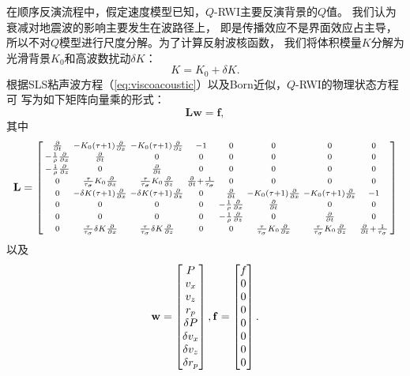 在顺序反演流程中，假定速度模型已知，$Q$-RWI主要反演背景的$Q$值。
我们认为衰减对地震波的影响主要发生在波路径上，
即是传播效应不是界面效应占主导，所以不对$Q$模型进行尺度分解。为了计算反射波核函数，
我们将体积模量$K$分解为光滑背景$K_0$和高波数扰动$\delta K$：
\begin{equation}
	K = K_0 + \delta K.
\end{equation}
根据SLS粘声波方程（\ref{eq:viscoacoustic}）以及Born近似，$Q$-RWI的物理状态方程可
写为如下矩阵向量乘的形式：
\begin{equation}
    \mathbf{L}\mathbf{w} = \mathbf{f},
    \label{eq:state}
\end{equation}
其中
    \begin{eqnarray*}
        \mathbf{L}= 
        \begin{bmatrix}
            \begin{smallmatrix}
            \frac{\partial}{\partial t} &-K_0(\tau +1)\frac{\partial}{\partial x}
            &-K_0(\tau +1)\frac{\partial}{\partial z} &-1 &0 &0 &0 &0\cr
            -\frac{1}{\rho}\frac{\partial}{\partial x} &\frac{\partial}{\partial t} &0
            &0 &0 &0 &0 &0\cr
            -\frac{1}{\rho}\frac{\partial}{\partial z} &0 &\frac{\partial}{\partial t}
            &0 &0 &0 &0 &0\cr
            0 & \frac{\tau}{\tau_\sigma}K_0\frac{\partial}{\partial x}
            &\frac{\tau}{\tau_\sigma}K_0\frac{\partial}{\partial z}
            &\frac{\partial}{\partial t}+\frac{1}{\tau_\sigma} &0 &0 &0 &0 \cr
            0 &-\delta K(\tau+1)\frac{\partial}{\partial x} &-\delta
            K(\tau+1)\frac{\partial}{\partial z} &0 &\frac{\partial}{\partial t}
            &-K_0(\tau +1)\frac{\partial}{\partial x} &-K_0(\tau
            +1)\frac{\partial}{\partial z} &-1 \cr
            0 &0 &0 &0 &-\frac{1}{\rho}\frac{\partial}{\partial x}
            &\frac{\partial}{\partial t} &0 &0\cr
            0 &0 &0 &0 &-\frac{1}{\rho}\frac{\partial}{\partial z} &0
            &\frac{\partial}{\partial t} &0\cr
            0 &\frac{\tau}{\tau_\sigma}\delta K\frac{\partial}{\partial x}
            &\frac{\tau}{\tau_\sigma}\delta K\frac{\partial}{\partial z} &0 &0 
            & \frac{\tau}{\tau_\sigma}K_0\frac{\partial}{\partial x}
            &\frac{\tau}{\tau_\sigma}K_0\frac{\partial}{\partial z}
            &\frac{\partial}{\partial t}+\frac{1}{\tau_\sigma}
            \end{smallmatrix}
        \end{bmatrix}
    \end{eqnarray*}
以及
    \begin{eqnarray*}
        \mathbf{w} = 
        \begin{bmatrix}
            P \cr v_x \cr v_z \cr r_p \cr\delta P \cr\delta v_x \cr\delta v_z
            \cr\delta r_p
        \end{bmatrix},
        \mathbf{f} = 
        \begin{bmatrix}
            f \cr 0\cr 0\cr 0 \cr 0\cr 0 \cr 0\cr 0
        \end{bmatrix}.
    \end{eqnarray*}
